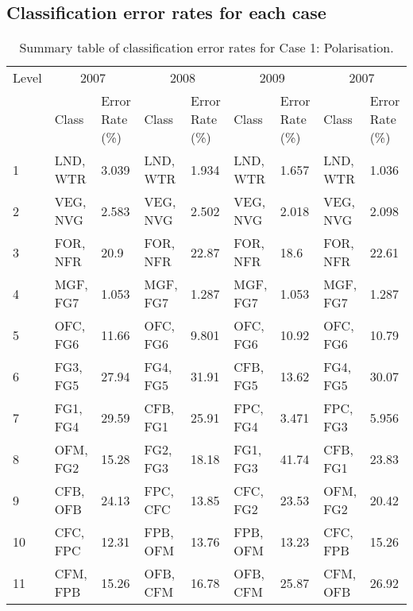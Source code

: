 \begin{appendices}
\clearpage


\section{Classification error rates for each case}
\label{app: appendix-error-rates}

\begin{spacing}{1.0}
\begin{longtable}[h!]{ p{1cm} p{1.5cm} p{1cm} p{1.5cm} p{1cm} p{1.5cm} p{1cm} p{1.5cm} p{1cm} }

    \caption[Summary table of classification error rates for Case 1: Polarisation.]{Summary table of classification error rates for Case 1: Polarisation.}
    \label{tab: appendix-table.c1}\\
    
    \toprule
    Level & \multicolumn{2}{c}{2007} & \multicolumn{2}{c}{2008} & \multicolumn{2}{c}{2009} & \multicolumn{2}{c}{2007}\\
    \cmidrule{2-9}
    {} & Class & Error Rate (\%) & Class & Error Rate (\%) & Class & Error Rate (\%) & Class & Error Rate (\%)\\
    \midrule
    \endhead

    1 & LND, WTR & 3.039 & LND, WTR & 1.934 & LND, WTR & 1.657 & LND, WTR & 1.036\\
    \cmidrule{2-9}
    2 & VEG, NVG & 2.583 & VEG, NVG & 2.502 & VEG, NVG & 2.018 & VEG, NVG & 2.098\\
    \cmidrule{2-9}
    3 & FOR, NFR & 20.9 & FOR, NFR & 22.87 & FOR, NFR & 18.6 & FOR, NFR & 22.61\\
    \cmidrule{2-9}
	4 & MGF, FG7 & 1.053 & MGF, FG7 & 1.287 & MGF, FG7 & 1.053 & MGF, FG7 & 1.287\\
    \cmidrule{2-9}
    5 & OFC, FG6 & 11.66 & OFC, FG6 & 9.801 & OFC, FG6 & 10.92 & OFC, FG6 & 10.79\\
    \cmidrule{2-9}
    6 & FG3, FG5 & 27.94 & FG4, FG5 & 31.91 & CFB, FG5 & 13.62 & FG4, FG5 & 30.07\\
    \cmidrule{2-9}
    7 & FG1, FG4 & 29.59 & CFB, FG1 & 25.91 & FPC, FG4 & 3.471 & FPC, FG3 & 5.956\\
    \cmidrule{2-9}
    8 & OFM, FG2 & 15.28 & FG2, FG3 & 18.18 & FG1, FG3 & 41.74 & CFB, FG1 & 23.83\\
    \cmidrule{2-9}
    9 & CFB, OFB & 24.13 & FPC, CFC & 13.85 & CFC, FG2 & 23.53 & OFM, FG2 & 20.42\\
    \cmidrule{2-9}
    10 & CFC, FPC & 12.31 & FPB, OFM & 13.76 & FPB, OFM & 13.23 & CFC, FPB & 15.26\\
    \cmidrule{2-9}
    11 & CFM, FPB & 15.26 & OFB, CFM & 16.78 & OFB, CFM & 25.87 & CFM, OFB & 26.92\\
	

\end{longtable}
\end{spacing}
\end{appendices}
